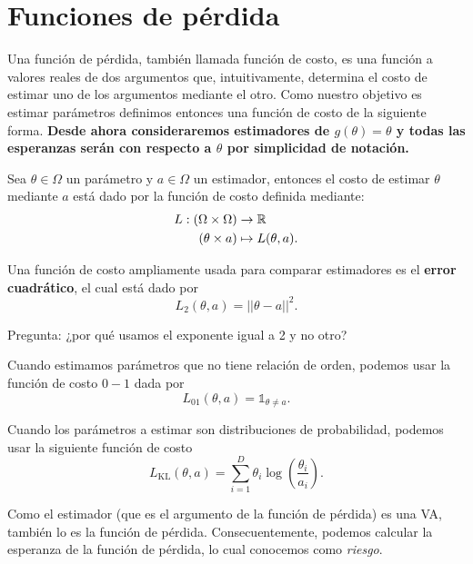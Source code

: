\section{Funciones de pérdida}

Una función de pérdida, también llamada función de costo, es una función a valores reales de dos argumentos que, intuitivamente, determina el costo de estimar uno de los argumentos mediante el otro. Como nuestro objetivo es estimar parámetros definimos entonces una función de costo de la siguiente forma. \textbf{Desde ahora consideraremos estimadores de $g(\theta) = \theta$ y todas las esperanzas serán con respecto a $\theta$ por simplicidad de notación.}

\begin{definition}
Sea $\theta\in\Omega$ un parámetro y $a\in\Omega$ un estimador, entonces el costo de estimar $\theta$ mediante $a$ está dado por la función de costo definida mediante:
\begin{align}
    L: (\Omega \times \Omega) &\rightarrow {\mathbb R}\\
    (\theta \times a) &\mapsto L(\theta,a).
\end{align}

\end{definition}

\begin{example}
	\label{ex:costo_cuadrático}
Una función de costo ampliamente usada para comparar estimadores es el \textbf{error cuadrático}, el cual
está dado por  
$$
L_2(\theta,a) = ||\theta-a||^{2}.
$$
\end{example}
Pregunta: ¿por qué usamos el exponente igual a 2 y no otro?

\begin{example}
	\label{ex:costo_0-1}
Cuando estimamos parámetros que no tiene relación de orden, podemos usar la función de costo $0-1$ dada por
$$
L_{01}(\theta,a) = \mathbb{1}_{\theta\neq a}.
$$
\end{example}

\begin{example}
	\label{ex:costo_KL}
Cuando los parámetros a estimar son distribuciones de probabilidad, podemos usar la siguiente función de costo
$$
L_{\text{KL}}(\theta,a) = \sum_{i=1}^D\theta_i \log\left(\frac{\theta_i}{a_i}\right).
$$
\end{example}

	
Como el estimador (que es el argumento de la función de pérdida) es una VA, también lo es la función de pérdida.  Consecuentemente, podemos calcular la esperanza de la función de pérdida, lo cual conocemos como \textit{riesgo}. 

